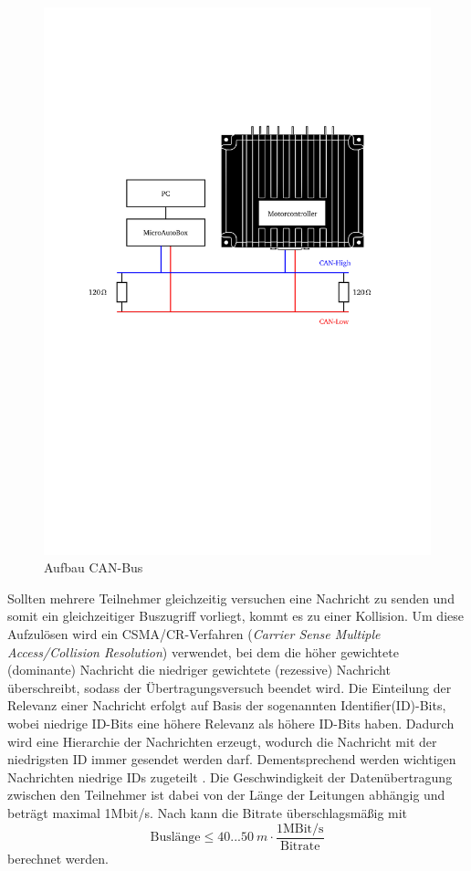 \begin{figure}[h]
	\centering
		\includegraphics[width=0.6\columnwidth]{Bilder/CAN2.pdf}
	\caption{Aufbau CAN-Bus \cite[S.158]{manual}}
	\label{fig:CAN}
\end{figure} \noindent

Sollten mehrere Teilnehmer gleichzeitig versuchen eine Nachricht zu senden und somit ein gleichzeitiger Buszugriff vorliegt, kommt es zu einer Kollision. Um diese Aufzulösen wird ein CSMA/CR-Verfahren (\textit{Carrier Sense Multiple Access/Collision Resolution}) verwendet, bei dem die höher gewichtete (dominante) Nachricht die niedriger gewichtete (rezessive) Nachricht überschreibt, sodass der Übertragungsversuch beendet wird. Die Einteilung der Relevanz einer Nachricht erfolgt auf Basis der sogenannten Identifier(ID)-Bits, wobei niedrige ID-Bits eine höhere Relevanz als höhere ID-Bits haben. Dadurch wird eine Hierarchie der Nachrichten erzeugt, wodurch die Nachricht mit der niedrigsten ID immer gesendet werden darf. Dementsprechend werden wichtigen Nachrichten niedrige IDs zugeteilt \cite{Lawrenz2010}. 
Die Geschwindigkeit der Datenübertragung zwischen den Teilnehmer ist dabei von der Länge der Leitungen abhängig und beträgt maximal 1Mbit/s. Nach \cite[S.58]{Werner2014} kann die Bitrate überschlagsmäßig mit 
\begin{equation}
	\text{Buslänge}\leq 40...\SI{50}{m}\cdot \frac{1\text{MBit/s}}{\text{Bitrate}}
	\label{eq:CAN}
\end{equation}
berechnet werden.

